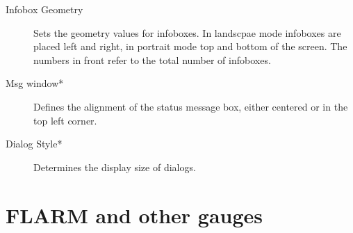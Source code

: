 \documentclass[a4paper,12pt]{refrep}
\begin{document}
\begin{description}
\item[Infobox Geometry]  Sets the geometry values for infoboxes. In landscpae
mode infoboxes are placed left and right, in portrait mode top and bottom of the screen. The numbers in front refer 
to the total number of infoboxes.
\item[Msg window*]  Defines the alignment of the status message box, either
centered or in the top left corner.
\item[Dialog Style*]  Determines the display size of dialogs.
\end{description}


\clearpage
\section{FLARM and other gauges}\label{sec:vario-gauge}
\end{document}
